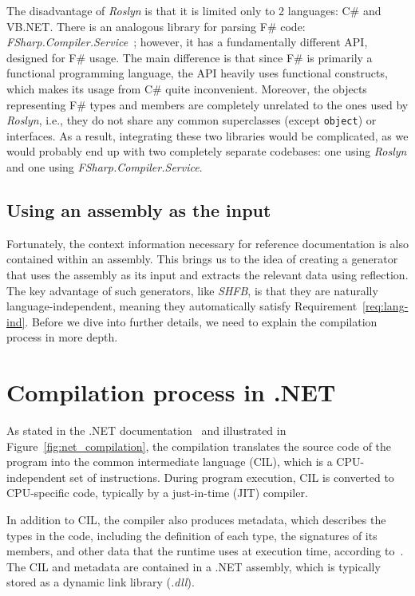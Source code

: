 The disadvantage of \textit{Roslyn} is that it is limited only to 2 languages: C\# and VB.NET.
There is an analogous library for parsing F\# code: \textit{FSharp.Compi\-ler.Service}~\cite{fsharp_compiler_service}; 
however, it has a fundamentally different API, designed for F\# usage.
The main difference is that since F\# is primarily a functional programming language, the API heavily uses functional constructs, which makes its usage from C\# quite inconvenient.
Moreover, the objects representing F\# types and members are completely unrelated to the ones used by \textit{Roslyn}, i.e., they do not share any common superclasses (except \texttt{object}) or interfaces.
As a result, integrating these two libraries would be complicated, as we would probably end up with two completely separate codebases: one using \textit{Roslyn} and one using \textit{FSharp.Compiler.Service}.

\subsection*{Using an assembly as the input}

Fortunately, the context information necessary for reference documentation is also contained within an assembly. 
This brings us to the idea of creating a generator that uses the assembly as its input and extracts the relevant data using reflection.
The key advantage of such generators, like \textit{SHFB}, is that they are naturally language-independent, meaning they automatically satisfy Requirement~\ref{req:lang-ind}.
Before we dive into further details, we need to explain the compilation process in more depth.

\section{Compilation process in .NET}

As stated in the .NET documentation~\cite{dotnet_execution_model} and illustrated in Figure~\ref{fig:net_compilation}, the compilation translates the source code of the program 
into the common intermediate language (CIL), which is a CPU-independent set of instructions. 
During program execution, CIL is converted to CPU-specific code, typically by a just-in-time (JIT) compiler.

In addition to CIL, the compiler also produces metadata, which describes the types in the code, including the definition of each type, the signatures of its members, and other data that the runtime uses at execution time, according to~\cite{dotnet_execution_model}.
The CIL and metadata are contained in a .NET assembly, which is typically stored as a dynamic link library (\textit{.dll}).

